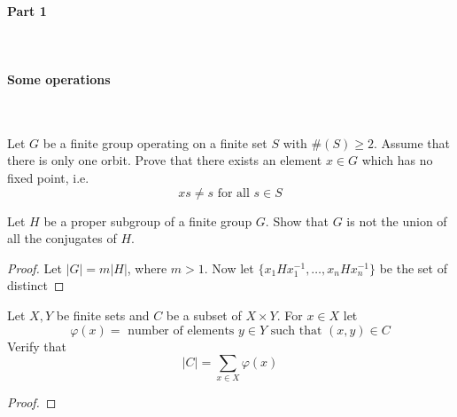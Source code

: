 

\paragraph*{Part 1}


\



\paragraph*{Some operations}

\

\begin{exercise}
    Let $G$ be a finite group operating on a finite set $S$ with $\#(S)\geq 2$. Assume that there is only one orbit. Prove that there exists an element $x\in G$ which has no fixed point, i.e. \[xs \neq s \text{ for all }s\in S\]
\end{exercise}

\begin{exercise}
    Let $H$ be a proper subgroup of a finite group $G$. Show that $G$ is not the union of all the conjugates of $H$.
    \begin{proof}
        Let $|G| = m|H|$, where $m> 1$. Now let $\{x_1Hx_1^{-1},\ldots,x_n H x_n^{-1}\}$ be the set of distinct 
    \end{proof}
\end{exercise}


\begin{exercise}
    Let $X,Y$ be finite sets and $C$ be a subset of $X\times Y$. For $x\in X$ let \[\varphi(x) = \text{ number of elements }y\in Y\text{ such that }(x,y)\in C\]
    Verify that \[
        |C| = \sum_{x\in X}\varphi(x)    
    \]
    \begin{proof}
        
    \end{proof}
\end{exercise}

